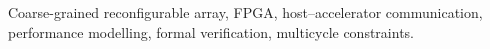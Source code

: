 \begin{IEEEkeywords}
Coarse-grained reconfigurable array, FPGA, host--accelerator communication,
performance modelling, formal verification, multicycle constraints.
\end{IEEEkeywords}
